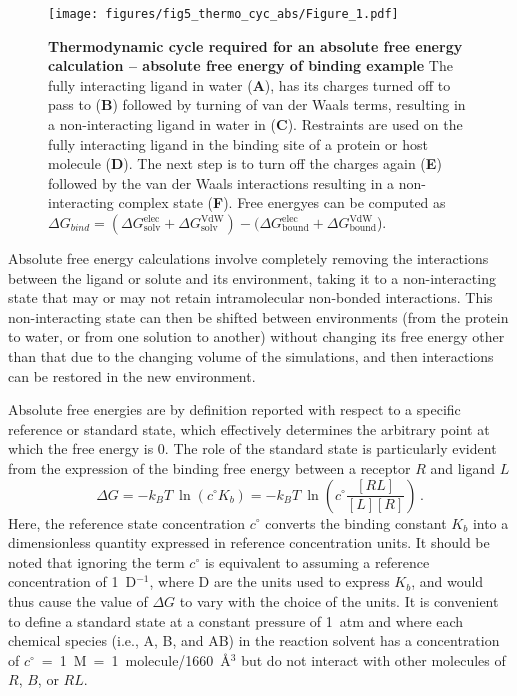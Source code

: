 \documentclass[9pt,bestpractices]{livecoms}
\begin{document}
\begin{figure}
    \texttt{[image: figures/fig5\_thermo\_cyc\_abs/Figure\_1.pdf]}
    \caption{\textbf{Thermodynamic cycle required for an absolute free energy calculation -- absolute free energy of binding example} The fully interacting ligand in water (\textbf{A}), has its charges turned off to pass to (\textbf{B}) followed by turning of van der Waals terms, resulting in a non-interacting ligand in water in (\textbf{C}). Restraints are used on the fully interacting ligand in the binding site of a protein or host molecule (\textbf{D}). The next step is to turn off the charges again (\textbf{E}) followed by the van der Waals interactions resulting in a non-interacting complex state (\textbf{F}). Free energyes can be computed as $\Delta G_{bind} = (\Delta G^{\mathrm{elec}}_{\mathrm{solv}}+ \Delta G^{\mathrm{VdW}}_{\mathrm{solv}})-(\Delta G^{\mathrm{elec}}_{\mathrm{bound}}+ \Delta G^{\mathrm{VdW}}_{\mathrm{bound}}$).
    }
    \label{fig:fig_absolute_thermodynamic_cycle}
\end{figure}

Absolute free energy calculations involve completely removing the interactions between the ligand or solute and its environment, taking it to a non-interacting state that may or may not retain intramolecular non-bonded interactions.
This non-interacting state can then be shifted between environments (from the protein to water, or from one solution to another) without changing its free energy other than that due to the changing volume of the simulations, and then interactions can be restored in the new environment.

Absolute free energies are by definition reported with respect to a specific reference or standard state, which effectively determines the arbitrary point at which the free energy is 0.
The role of the standard state is particularly evident from the expression of the binding free energy between a receptor $R$ and ligand $L$
\begin{equation} \label{eq:DGfromKAB}
    \Delta G = -k_BT ~ \ln \left( c^{\circ} K_b \right)  = -k_BT ~ \ln\left( c^{\circ} \frac{[RL]}{[L][R]} \right) \, .
\end{equation}
Here, the reference state concentration $c^{\circ}$ converts the binding constant $K_b$ into a dimensionless quantity expressed in reference concentration units.
It should be noted that ignoring the term $c^{\circ}$ is equivalent to assuming a reference concentration of 1~D$^{-1}$, where D are the units used to express $K_b$, and would thus cause the value of $\Delta G$ to vary with the choice of the units.
It is convenient to define a standard state at a constant pressure of 1~atm and where each chemical species (i.e., A, B, and AB) in the reaction solvent has a concentration of $c^{\circ}$~=~1~M~=~1~molecule/1660~\r{A}$^3$ but do not interact with other molecules of $R$, $B$, or $RL$.
\end{document}
